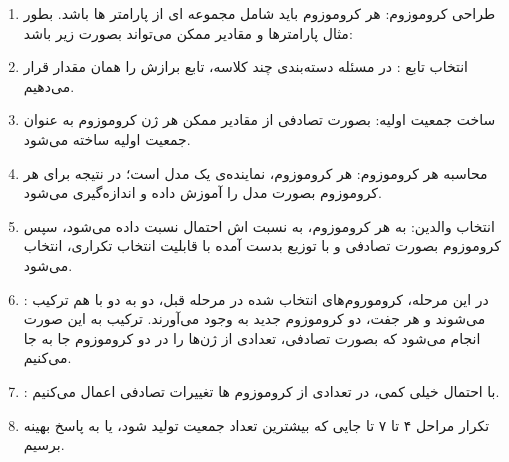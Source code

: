 \documentclass[12pt,onecolumn,a4paper]{article}
\begin{document}
\begin{enumerate}

    \item طراحی کروموزوم: هر کروموزوم باید شامل مجموعه ای از پارامتر ها باشد. بطور مثال پارامتر‌ها و مقادیر ممکن می‌تواند بصورت زیر باشد:

    
    \item انتخاب تابع : در مسئله دسته‌بندی چند کلاسه، تابع برازش را همان مقدار  قرار می‌دهیم.
    \item ساخت جمعیت اولیه: بصورت تصادفی از مقادیر ممکن هر ژن  کروموزوم به عنوان جمعیت اولیه ساخته می‌شود.
    \item محاسبه  هر کروموزوم: هر کروموزوم، نماینده‌ی یک مدل است؛ در نتیجه برای هر کروموزوم بصورت  مدل را آموزش داده و  اندازه‌گیری می‌شود.
    \item انتخاب والدین: به هر کروموزوم، به نسبت  اش احتمال نسبت داده می‌شود، سپس  کروموزوم بصورت تصادفی و با توزیع بدست آمده با قابلیت انتخاب تکراری، انتخاب می‌شود.
    \item {}: در این مرحله، کروموروم‌های انتخاب شده در مرحله قبل، دو به دو با هم ترکیب می‌شوند و هر جفت، دو کروموزوم جدید به وجود می‌آورند. ترکیب به این صورت انجام می‌شود که بصورت تصادفی، تعدادی از ژن‌ها را در دو کروموزوم جا به جا می‌کنیم.
    \item {}: با احتمال خیلی کمی، در تعدادی از کروموزوم ها تغییرات تصادفی اعمال می‌کنیم.
    \item تکرار مراحل ۴ تا ۷ تا جایی که بیشترین تعداد جمعیت تولید شود، یا به پاسخ بهینه برسیم.
\end{enumerate}
\end{document}
